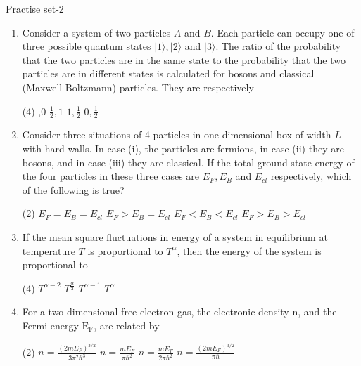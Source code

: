 \newpage
\begin{abox}
	Practise set-2
\end{abox}
\begin{enumerate}
	\item Consider a system of two particles $A$ and $B$. Each particle can occupy one of three possible quantum states $|1\rangle,|2\rangle$ and $|3\rangle$. The ratio of the probability that the two particles
are in the same state to the probability that the two particles are in different states is calculated for bosons and classical (Maxwell-Boltzmann) particles. They are respectively
{}

\begin{tasks}(4)
	,0
	\task[\textbf{B.}]  $\frac{1}{2}, 1$
	\task[\textbf{C.}] $1, \frac{1}{2}$
	\task[\textbf{D.}] $0, \frac{1}{2}$
\end{tasks}

\item Consider three situations of 4 particles in one dimensional box of width $L$ with hard walls. In case (i), the particles are fermions, in case (ii) they are bosons, and in case (iii) they are classical. If the total ground state energy of the four particles in these three cases are $E_{F}, E_{B}$ and $E_{c l}$ respectively, which of the following is true?
{}
\begin{tasks}(2)
	\task[\textbf{A.}] $E_{F}=E_{B}=E_{c l}$
	\task[\textbf{B.}] $E_{F}>E_{B}=E_{c l}$
	\task[\textbf{C.}] $E_{F}<E_{B}<E_{c l}$
	\task[\textbf{D.}] $E_{F}>E_{B}>E_{c l}$
\end{tasks}

\item If the mean square fluctuations in energy of a system in equilibrium at temperature $T$ is proportional to $T^{\alpha}$, then the energy of the system is proportional to
{}
\begin{tasks}(4)
	\task[\textbf{A.}] $T^{\alpha-2}$
	\task[\textbf{B.}] $T^{\frac{\alpha}{2}}$
	\task[\textbf{C.}] $T^{\alpha-1}$
	\task[\textbf{D.}] $T^{\alpha}$
\end{tasks}
\item For a two-dimensional free electron gas, the electronic density $\mathrm{n}$, and the Fermi energy $\mathrm{E}_{\mathrm{F}}$, are related by
{}
\begin{tasks}(2)
	\task[\textbf{A.}] $n=\frac{\left(2 m E_{F}\right)^{3 / 2}}{3 \pi^{2} \hbar^{3}}$
	\task[\textbf{B.}] $n=\frac{m E_{F}}{\pi \hbar^{2}}$
	\task[\textbf{C.}] $n=\frac{m E_{F}}{2 \pi \hbar^{2}}$
	\task[\textbf{D.}] $n=\frac{\left(2 m E_{F}\right)^{3 / 2}}{\pi \hbar}$
\end{tasks}


\end{enumerate}
